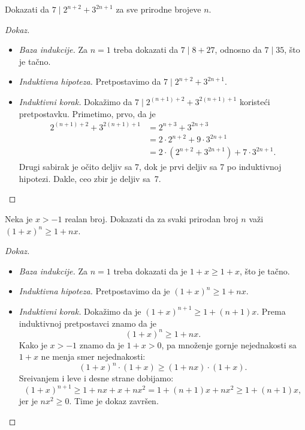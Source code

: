 \begin{EX}
  Dokazati da $7 \mid 2^{n+2} + 3^{2n + 1}$ za sve prirodne brojeve $n$.
\end{EX}
\begin{proof}[Dokaz]
  \begin{itemize}
  \item
    \emph{Baza indukcije.} Za $n = 1$ treba dokazati da $7 \mid 8 + 27$, odnosno da $7 \mid 35$, \v sto je ta\v cno.
  
  \item
    \emph{Induktivna hipoteza.} Pretpostavimo da $7 \mid 2^{n+2} + 3^{2n + 1}$.
  \item
    \emph{Induktivni korak.} Doka\v zimo da $7 \mid 2^{(n + 1)+2} + 3^{2(n + 1) + 1}$ koriste\'ci pretpostavku.
    Primetimo, prvo, da je
    \begin{align*}
      2^{(n + 1) + 2} + 3^{2(n + 1) + 1}
      &= 2^{n + 3} + 3^{2n + 3}\\
      &= 2 \cdot 2^{n + 2} + 9 \cdot 3^{2n + 1}\\
      &= 2 \cdot (2^{n + 2} + 3^{2n + 1}) + 7 \cdot 3^{2n + 1}.
    \end{align*}
    Drugi sabirak je o\v cito deljiv sa 7, dok je prvi deljiv sa 7 po induktivnoj hipotezi. Dakle, ceo zbir je deljiv sa~7.\qedhere
  \end{itemize}
\end{proof}

\begin{EX}
  Neka je $x > -1$ realan broj. Dokazati da za svaki prirodan broj $n$ va\v zi
  $(1 + x)^n \ge 1 + nx$.
\end{EX}
\begin{proof}[Dokaz]
  \begin{itemize}
  \item
    \emph{Baza indukcije.} Za $n = 1$ treba dokazati da je $1 + x \ge 1 + x$, \v sto je ta\v cno.
  
  \item
    \emph{Induktivna hipoteza.} Pretpostavimo da je $(1 + x)^n \ge 1 + nx$.
  \item
    \emph{Induktivni korak.} Doka\v zimo da je $(1 + x)^{n + 1} \ge 1 + (n + 1)x$. Prema induktivnoj pretpostavci znamo da je
    $$
      (1 + x)^n \ge 1 + nx.
    $$
    Kako je $x > -1$ znamo da je $1 + x > 0$, pa mno\v zenje gornje nejednakosti sa $1 + x$ ne menja smer nejednakosti:
    $$
      (1 + x)^n \cdot (1 + x) \ge (1 + nx) \cdot (1 + x).
    $$
    Sre\dj ivanjem i leve i desne strane dobijamo:
    $$
      (1 + x)^{n + 1} \ge 1 + nx + x + nx^2 = 1 + (n + 1)x + nx^2 \ge 1 + (n + 1)x,
    $$
    jer je $nx^2 \ge 0$. Time je dokaz zavr\v sen.\qedhere
  \end{itemize}
\end{proof}

